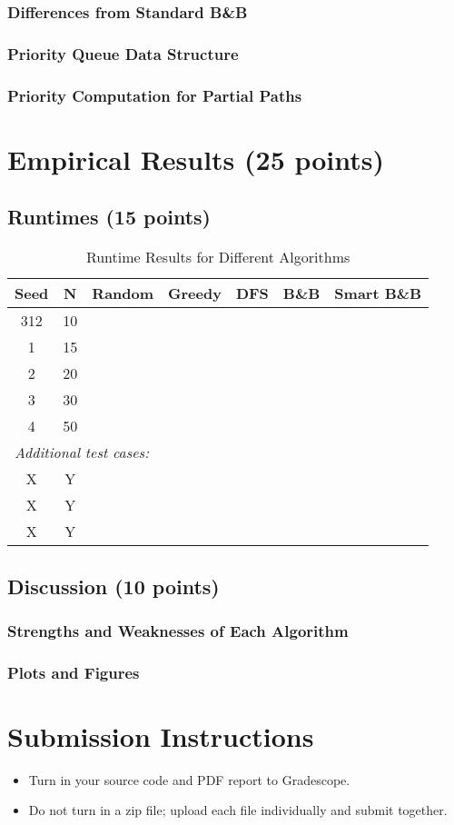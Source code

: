 \documentclass[12pt]{article}
\begin{document}
\subsubsection*{Differences from Standard B\&B}
\subsubsection*{Priority Queue Data Structure}
\subsubsection*{Priority Computation for Partial Paths}

\section*{Empirical Results (25 points)}

\subsection*{Runtimes (15 points)}

\begin{table}[h!]
\centering
\begin{tabular}{ccccccc}
\toprule
Seed & N & Random & Greedy & DFS & B\&B & Smart B\&B \\
\midrule
312 & 10 & & & & & \\
1   & 15 & & & & & \\
2   & 20 & & & & & \\
3   & 30 & & & & & \\
4   & 50 & & & & & \\
\midrule
\multicolumn{7}{l}{\textit{Additional test cases:}} \\
X   & Y  & & & & & \\
X   & Y  & & & & & \\
X   & Y  & & & & & \\
\bottomrule
\end{tabular}
\caption{Runtime Results for Different Algorithms}
\label{tab:runtimes}
\end{table}

\subsection*{Discussion (10 points)}

\subsubsection*{Strengths and Weaknesses of Each Algorithm}
\subsubsection*{Plots and Figures}

\section*{Submission Instructions}
\begin{itemize}
    \item Turn in your source code and PDF report to Gradescope.
    \item Do not turn in a zip file; upload each file individually and submit together.
\end{itemize}
\end{document}
